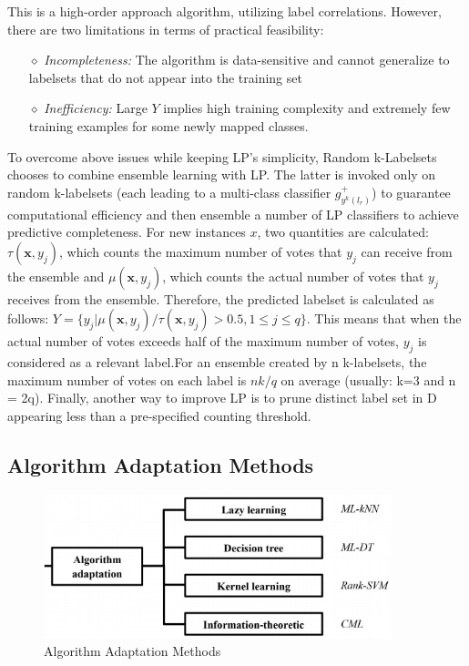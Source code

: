 \documentclass[12pt]{report}
\begin{document}
	This is a high-order approach algorithm, utilizing label correlations. However, there are two limitations in terms of practical feasibility: 
	
	\begin{itemize}
		\item[$\diamond$] \emph{Incompleteness: }The algorithm is data-sensitive and cannot generalize to labelsets that do not appear into the training set
		\item[$\diamond$] \emph{Inefficiency: }Large $Y$ implies high training complexity and extremely few training examples for some newly mapped classes.
	\end{itemize}

	To overcome above issues while keeping LP's simplicity, Random k-Labelsets chooses to combine ensemble learning with LP. The latter is invoked only on random k-labelsets (each leading to a multi-class classifier $g_{y^k(l_r)}^+$) to guarantee computational efficiency and then ensemble a number of LP classifiers to achieve predictive completeness. For new instances $x$, two quantities are calculated: $\tau(\textbf{x},y_j)$, which counts the maximum number of votes that $y_j$ can receive from the ensemble and $\mu(\textbf{x},y_j)$, which counts the actual number of votes that $y_j$ receives from the ensemble. Therefore, the predicted labelset is calculated as follows: $Y = \{y_j|\mu(\textbf{x},y_j)/\tau(\textbf{x},y_j)>0.5,  1 \leq j \leq q\}$. This means that when the actual number of votes exceeds half of the maximum number of votes, $y_j$ is considered as a relevant label.For an ensemble created by n k-labelsets, the maximum number of votes on each label is $nk/q$ on average (usually: k=3 and n = 2q). Finally, another way to improve LP is to prune distinct label set in D appearing less than a pre-specified counting threshold.
	
	\subsection*{Algorithm Adaptation Methods}
	
	\begin{figure}[H]
		\centering
		\includegraphics[width=0.9\textwidth]{aa.png}
		\caption{Algorithm Adaptation Methods}
		\centering
	\end{figure}
\end{document}
